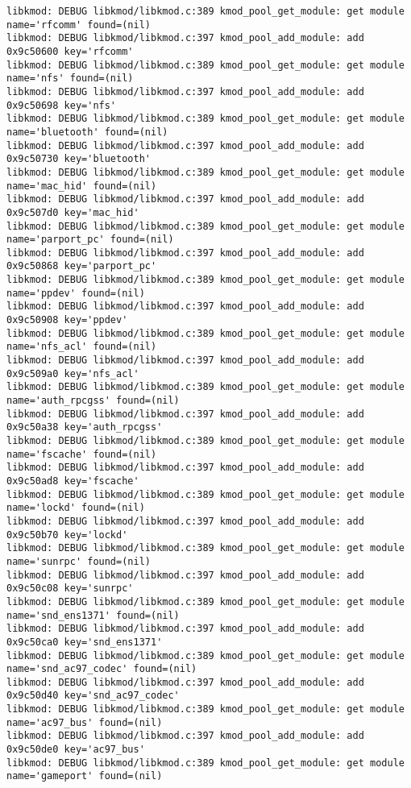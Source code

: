 \documentclass[11pt,a4paper]{article}
\begin{document}
{\begin{shaded}
\begin{verbatim}
libkmod: DEBUG libkmod/libkmod.c:389 kmod_pool_get_module: get module name='rfcomm' found=(nil)
libkmod: DEBUG libkmod/libkmod.c:397 kmod_pool_add_module: add 0x9c50600 key='rfcomm'
libkmod: DEBUG libkmod/libkmod.c:389 kmod_pool_get_module: get module name='nfs' found=(nil)
libkmod: DEBUG libkmod/libkmod.c:397 kmod_pool_add_module: add 0x9c50698 key='nfs'
libkmod: DEBUG libkmod/libkmod.c:389 kmod_pool_get_module: get module name='bluetooth' found=(nil)
libkmod: DEBUG libkmod/libkmod.c:397 kmod_pool_add_module: add 0x9c50730 key='bluetooth'
libkmod: DEBUG libkmod/libkmod.c:389 kmod_pool_get_module: get module name='mac_hid' found=(nil)
libkmod: DEBUG libkmod/libkmod.c:397 kmod_pool_add_module: add 0x9c507d0 key='mac_hid'
libkmod: DEBUG libkmod/libkmod.c:389 kmod_pool_get_module: get module name='parport_pc' found=(nil)
libkmod: DEBUG libkmod/libkmod.c:397 kmod_pool_add_module: add 0x9c50868 key='parport_pc'
libkmod: DEBUG libkmod/libkmod.c:389 kmod_pool_get_module: get module name='ppdev' found=(nil)
libkmod: DEBUG libkmod/libkmod.c:397 kmod_pool_add_module: add 0x9c50908 key='ppdev'
libkmod: DEBUG libkmod/libkmod.c:389 kmod_pool_get_module: get module name='nfs_acl' found=(nil)
libkmod: DEBUG libkmod/libkmod.c:397 kmod_pool_add_module: add 0x9c509a0 key='nfs_acl'
libkmod: DEBUG libkmod/libkmod.c:389 kmod_pool_get_module: get module name='auth_rpcgss' found=(nil)
libkmod: DEBUG libkmod/libkmod.c:397 kmod_pool_add_module: add 0x9c50a38 key='auth_rpcgss'
libkmod: DEBUG libkmod/libkmod.c:389 kmod_pool_get_module: get module name='fscache' found=(nil)
libkmod: DEBUG libkmod/libkmod.c:397 kmod_pool_add_module: add 0x9c50ad8 key='fscache'
libkmod: DEBUG libkmod/libkmod.c:389 kmod_pool_get_module: get module name='lockd' found=(nil)
libkmod: DEBUG libkmod/libkmod.c:397 kmod_pool_add_module: add 0x9c50b70 key='lockd'
libkmod: DEBUG libkmod/libkmod.c:389 kmod_pool_get_module: get module name='sunrpc' found=(nil)
libkmod: DEBUG libkmod/libkmod.c:397 kmod_pool_add_module: add 0x9c50c08 key='sunrpc'
libkmod: DEBUG libkmod/libkmod.c:389 kmod_pool_get_module: get module name='snd_ens1371' found=(nil)
libkmod: DEBUG libkmod/libkmod.c:397 kmod_pool_add_module: add 0x9c50ca0 key='snd_ens1371'
libkmod: DEBUG libkmod/libkmod.c:389 kmod_pool_get_module: get module name='snd_ac97_codec' found=(nil)
libkmod: DEBUG libkmod/libkmod.c:397 kmod_pool_add_module: add 0x9c50d40 key='snd_ac97_codec'
libkmod: DEBUG libkmod/libkmod.c:389 kmod_pool_get_module: get module name='ac97_bus' found=(nil)
libkmod: DEBUG libkmod/libkmod.c:397 kmod_pool_add_module: add 0x9c50de0 key='ac97_bus'
libkmod: DEBUG libkmod/libkmod.c:389 kmod_pool_get_module: get module name='gameport' found=(nil)

\end{verbatim}
\end{shaded}}
\end{document}
